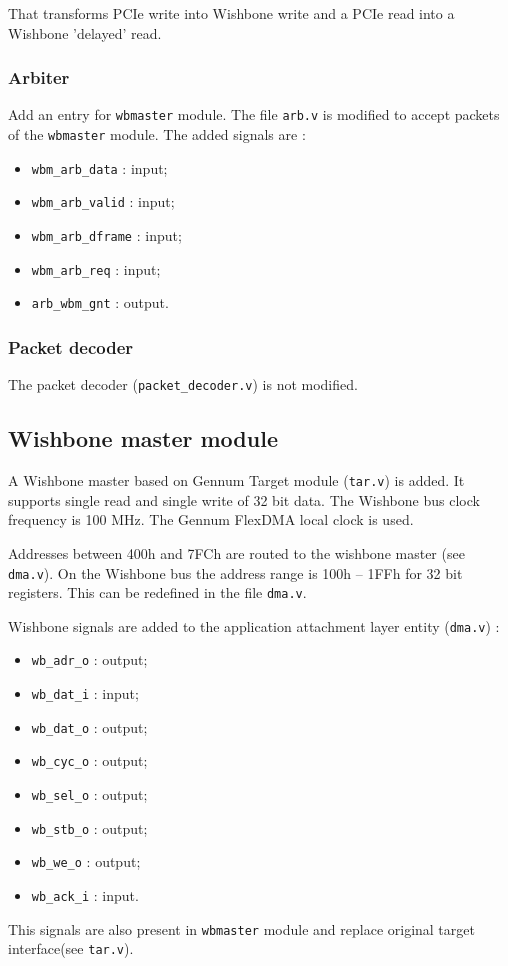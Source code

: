 \documentclass[10pt,a4paper]{cerndoc}
\begin{document}
That transforms PCIe write into Wishbone write and a PCIe read into a Wishbone 'delayed' read.


  
    \subsubsection{Arbiter}
Add an entry for \verb+wbmaster+ module. The file \verb+arb.v+ is modified to accept packets of the \verb+wbmaster+ module.
The added signals are :
\begin{itemize}
  \item\texttt{wbm\_arb\_data} : input;
  \item\texttt{wbm\_arb\_valid} : input;
  \item\texttt{wbm\_arb\_dframe} : input;
  \item\texttt{wbm\_arb\_req} : input; 
  \item\texttt{arb\_wbm\_gnt} : output.
  
\end{itemize}
    \subsubsection{Packet decoder}
The packet decoder (\verb+packet_decoder.v+) is not modified.
    
  \subsection{Wishbone master module}  
A Wishbone master based on Gennum Target module (\verb+tar.v+) is added. It supports single read and single write of 32 bit data.
The Wishbone bus clock frequency is 100 MHz. The Gennum FlexDMA local clock is used.
   
Addresses between 400h and 7FCh are routed to the wishbone master (see \verb+dma.v+). On the Wishbone bus the address range is 100h -- 1FFh for 32 bit registers. This can be redefined in the file \verb+dma.v+.  
    
Wishbone signals are added to the application attachment layer entity (\verb+dma.v+) :
\begin{itemize}
  \item\texttt{wb\_adr\_o} : output;
  \item\texttt{wb\_dat\_i} : input;
  \item\texttt{wb\_dat\_o} : output;
  \item\texttt{wb\_cyc\_o} : output;
  \item\texttt{wb\_sel\_o} : output;
  \item\texttt{wb\_stb\_o} : output;
  \item\texttt{wb\_we\_o} : output;
  \item\texttt{wb\_ack\_i} : input.
\end{itemize}     
   This signals are also present in \verb+wbmaster+ module and replace original target interface(see \verb+tar.v+).
\end{document}
